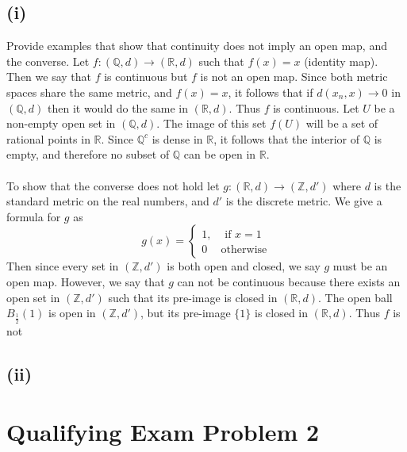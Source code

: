 \documentclass{article}
\begin{document}
    \subsection*{(i)}
        Provide examples that show that continuity does not imply an open map, and the converse. Let
        $f: (\mathbb{Q},d) \rightarrow (\mathbb{R},d)$ such that $f(x) = x$ (identity map). Then we say
        that $f$ is continuous but $f$ is not an open map. Since both metric spaces share the same metric,
        and $f(x) = x$, it follows that if $d(x_n,x) \rightarrow 0$ in $(\mathbb{Q}, d)$ then it would do the
        same in $(\mathbb{R}, d)$. Thus $f$ is continuous. Let $U$ be a non-empty open set in $(\mathbb{Q}, d)$.
        The image of this set $f(U)$ will be a set of rational points in $\mathbb{R}$. Since $\mathbb{Q}^c$ is 
        dense in $\mathbb{R}$, it follows that the interior of $\mathbb{Q}$ is empty, and therefore no subset
        of $\mathbb{Q}$ can be open in $\mathbb{R}$.\\\\
        To show that the converse does not hold let $g: (\mathbb{R}, d) \rightarrow (\mathbb{Z}, d')$ where
        $d$ is the standard metric on the real numbers, and $d'$ is the discrete metric. We give a formula for $g$
        as
        \[
            g(x) = \begin{cases}
                1, & \text{ if }x = 1\\
                0 & \text{otherwise}
            \end{cases}  
        \]
        Then since every set in $(\mathbb{Z},d')$ is both open and closed, we say $g$ must be an open map.
        However, we say that $g$ can not be continuous because there exists an open set in $(\mathbb{Z},d')$ such
        that its pre-image is closed in $(\mathbb{R},d)$. The open ball $B_\frac{1}{2}(1)$ is open in $(\mathbb{Z},d')$,
        but its pre-image $\{1\}$ is closed in $(\mathbb{R},d)$. Thus $f$ is not
    \subsection*{(ii)}
\section*{Qualifying Exam Problem 2}
\end{document}
